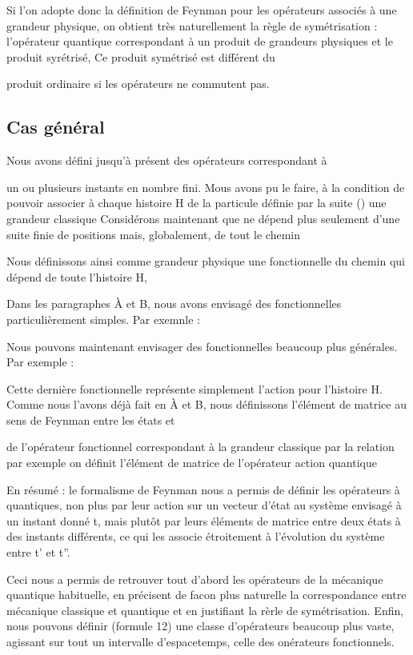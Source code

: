 Si l'on adopte donc la définition de Feynman pour les opérateurs
associés à une grandeur physique, on obtient très naturellement la règle de
symétrisation : l'opérateur quantique correspondant à un produit de grandeurs
physiques et le produit syrétrisé, Ce produit symétrisé est différent du

produit ordinaire si les opérateurs ne commutent pas.

\subsection{Cas général} %

Nous avons défini jusqu'à présent des opérateurs correspondant à

un ou plusieurs instants en nombre fini. Mous avons pu le faire, à la condition
de pouvoir associer à chaque histoire H de la particule définie par la
suite () une grandeur classique 
Considérons maintenant que  ne dépend plus seulement d'une
suite finie de positions  mais, globalement, de tout le chemin

Nous définissons ainsi comme grandeur physique une fonctionnelle du
chemin  qui dépend de toute l'histoire H,

Dans les paragraphes À et B, nous avons envisagé des fonctionnelles particulièrement simples. Par exemnle :

Nous pouvons maintenant envisager des fonctionnelles beaucoup
plus générales. Par exemple :

Cette dernière fonctionnelle représente simplement l'action
pour l'histoire H. Comme nous l'avons déjà fait en À et B, nous définissons
l'élément de matrice au sens de Feynman entre les états  et 

de l'opérateur fonctionnel  correspondant à la grandeur classique
par la relation
par exemple on définit l'élément de matrice de l'opérateur action quantique

En résumé : le formalisme de Feynman nous a permis de définir les opérateurs à
quantiques, non plus par leur action sur un vecteur d'état  au système
envisagé à un instant donné t, mais plutôt par leurs éléments de matrice
entre deux états à des instants différents, ce qui les associe étroitement
à l'évolution du système entre t' et t''.

Ceci nous a permis de retrouver tout d'abord les opérateurs de
la mécanique quantique habituelle, en précisent de facon plus naturelle la
correspondance entre mécanique classique et quantique et en justifiant la
rèrle de symétrisation. Enfin, nous pouvons définir (formule 12) une classe
d'opérateurs beaucoup plus vaste, agissant sur tout un intervalle d'espacetemps, celle des onérateurs fonctionnels.


